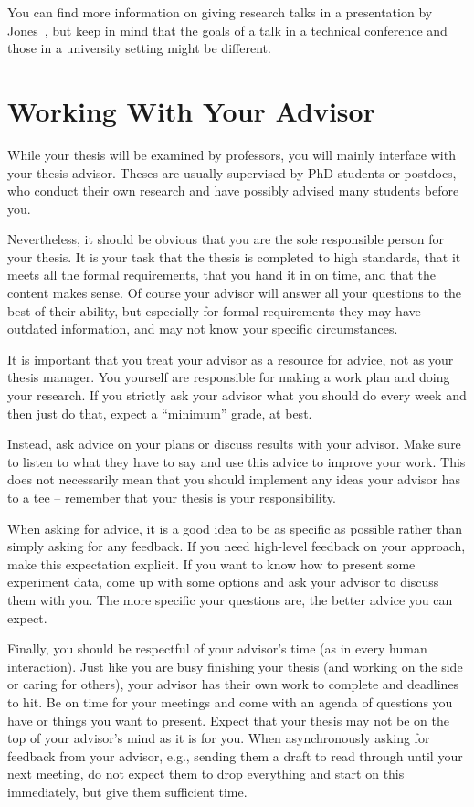 \documentclass[a4paper]{article}
\begin{document}
You can find more information on giving research talks in a presentation by Jones~\cite{jones-talk}, but keep in mind that the goals of a talk in a technical conference and those in a university setting might be different.

\section{Working With Your Advisor}
\label{sec:advisor}

While your thesis will be examined by professors, you will mainly interface with your thesis advisor.
Theses are usually supervised by PhD students or postdocs, who conduct their own research and have possibly advised many students before you.

Nevertheless, it should be obvious that you are the sole responsible person for your thesis.
It is your task that the thesis is completed to high standards, that it meets all the formal requirements, that you hand it in on time, and that the content makes sense.
Of course your advisor will answer all your questions to the best of their ability, but especially for formal requirements they may have outdated information, and may not know your specific circumstances.

It is important that you treat your advisor as a resource for advice, not as your thesis manager.
You yourself are responsible for making a work plan and doing your research.
If you strictly ask your advisor what you should do every week and then just do that, expect a ``minimum'' grade, at best.

Instead, ask advice on your plans or discuss results with your advisor.
Make sure to listen to what they have to say and use this advice to improve your work.
This does not necessarily mean that you should implement any ideas your advisor has to a tee -- remember that your thesis is your responsibility.

When asking for advice, it is a good idea to be as specific as possible rather than simply asking for any feedback.
If you need high-level feedback on your approach, make this expectation explicit.
If you want to know how to present some experiment data, come up with some options and ask your advisor to discuss them with you.
The more specific your questions are, the better advice you can expect.

Finally, you should be respectful of your advisor's time (as in every human interaction).
Just like you are busy finishing your thesis (and working on the side or caring for others), your advisor has their own work to complete and deadlines to hit.
Be on time for your meetings and come with an agenda of questions you have or things you want to present.
Expect that your thesis may not be on the top of your advisor's mind as it is for you.
When asynchronously asking for feedback from your advisor, e.g., sending them a draft to read through until your next meeting, do not expect them to drop everything and start on this immediately, but give them sufficient time.
\end{document}
